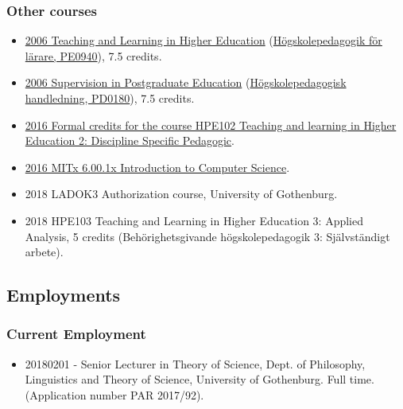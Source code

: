 \documentclass[
]{article}
\providecommand{\tightlist}{%
  \setlength{\itemsep}{0pt}\setlength{\parskip}{0pt}}
\begin{document}
\hypertarget{other-courses}{%
\subsubsection{Other courses}\label{other-courses}}

\begin{itemize}
\tightlist
\item
  \href{http://files.christopherkullenberg.se/hogskolepedagogikonline.pdf}{2006
  Teaching and Learning in Higher Education}
  (\href{http://files.christopherkullenberg.se/PE0940.pdf}{Högskolepedagogik
  för lärare, PE0940}), 7.5 credits.
\item
  \href{http://files.christopherkullenberg.se/hogskolepedagogikonline.pdf}{2006
  Supervision in Postgraduate Education}
  (\href{http://files.christopherkullenberg.se/PD0180.pdf}{Högskolepedagogisk
  handledning, PD0180}), 7.5 credits.
\item
  \href{http://kursplaner.gu.se/svenska/HPE102.pdf}{2016 Formal credits
  for the course HPE102 Teaching and learning in Higher Education 2:
  Discipline Specific Pedagogic}.
\item
  \href{https://courses.edx.org/certificates/f9c30b3913be4004b95813db59432509}{2016
  MITx 6.00.1x Introduction to Computer Science}.
\item
  2018 LADOK3 Authorization course, University of Gothenburg.
\item
  2018 HPE103 Teaching and Learning in Higher Education 3: Applied
  Analysis, 5 credits (Behörighetsgivande högskolepedagogik 3:
  Självständigt arbete).
\end{itemize}

\hypertarget{employments}{%
\subsection{Employments}\label{employments}}

\hypertarget{current-employment}{%
\subsubsection{Current Employment}\label{current-employment}}

\begin{itemize}
\tightlist
\item
  20180201 - Senior Lecturer in Theory of Science, Dept. of Philosophy,
  Linguistics and Theory of Science, University of Gothenburg. Full
  time. (Application number PAR 2017/92).
\end{itemize}
\end{document}

